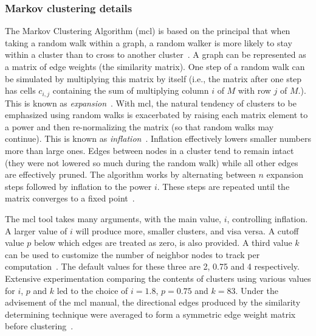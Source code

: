 \subsubsection{Markov clustering details}
The Markov Clustering Algorithm (mcl) is based on the principal that when taking a random walk within a graph, a random walker is more likely to stay within a cluster than to cross to another cluster~.  A graph can be represented as a matrix of edge weights (the similarity matrix).  One step of a random walk can be simulated by multiplying this matrix by itself (i.e., the matrix after one step has cells $c_{i,j}$ containing the sum of multiplying column $i$ of $M$ with row $j$ of $M$.).  This is known as \emph{expansion}~.  With mcl, the natural tendency of clusters to be emphasized using random walks is exacerbated by raising each matrix element to a power and then re-normalizing the matrix (so that random walks may continue).  This is known as \emph{inflation}~.  Inflation effectively lowers smaller numbers more than large ones.  Edges between nodes in a cluster tend to remain intact (they were not lowered so much during the random walk) while all other edges are effectively pruned.  The algorithm works by alternating between $n$ expansion steps followed by inflation to the power $i$.  These steps are repeated until the matrix converges to a fixed point~.

The mcl tool takes many arguments, with the main value, $i$, controlling inflation.  A larger value of $i$ will produce more, smaller clusters, and visa versa.  A cutoff value $p$ below which edges are treated as zero, is also provided.  A third value $k$ can be used to customize the number of neighbor nodes to track per computation~.  The default values for these three are 2, 0.75 and 4 respectively.  Extensive experimentation comparing the contents of clusters using various values for $i$, $p$ and $k$ led to the choice of $i=1.8$, $p=0.75$ and $k=83$.  Under the advisement of the mcl manual, the directional edges produced by the similarity determining technique were averaged to form a symmetric edge weight matrix before clustering~.
